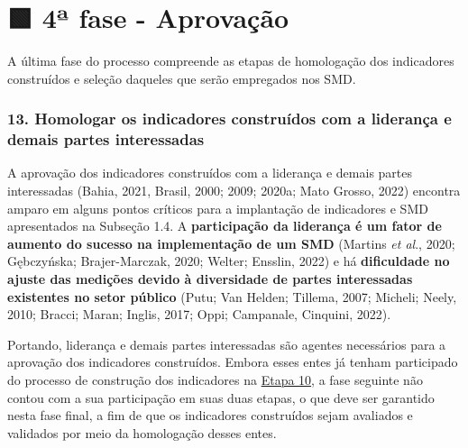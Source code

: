 \documentclass[
  letterpaper,
  DIV=11,
  numbers=noendperiod]{scrreprt}
\begin{document}
\hypertarget{uxaa-fase---aprovauxe7uxe3o}{%
\chapter*{🟩 4ª fase - Aprovação}\label{uxaa-fase---aprovauxe7uxe3o}}


{A última fase do processo compreende as etapas de homologação dos
indicadores construídos e seleção daqueles que serão empregados nos
SMD.}

\hypertarget{homologar-os-indicadores-construuxeddos-com-a-lideranuxe7a-e-demais-partes-interessadas}{%
\subsection*{13. Homologar os indicadores construídos com a liderança e
demais partes
interessadas}\label{homologar-os-indicadores-construuxeddos-com-a-lideranuxe7a-e-demais-partes-interessadas}}

A aprovação dos indicadores construídos com a liderança e demais partes
interessadas (Bahia, 2021, Brasil, 2000; 2009; 2020a; Mato Grosso, 2022)
encontra amparo em alguns pontos críticos para a implantação de
indicadores e SMD apresentados na Subseção 1.4. A \textbf{participação
da liderança é um fator de aumento do sucesso na implementação de um
SMD} (Martins \emph{et al}., 2020; Gębczyńska; Brajer-Marczak, 2020;
Welter; Ensslin, 2022) e há \textbf{dificuldade no ajuste das medições
devido à diversidade de partes interessadas existentes no setor público}
(Putu; Van Helden; Tillema, 2007; Micheli; Neely, 2010; Bracci; Maran;
Inglis, 2017; Oppi; Campanale, Cinquini, 2022).

Portando, liderança e demais partes interessadas são agentes necessários
para a aprovação dos indicadores construídos. Embora esses entes já
tenham participado do processo de construção dos indicadores na
\href{/o/AZWDclIWFqqJuBEvyQWk/s/ws6bIBOPv2tLRHdwbB7y/~/changes/788/3.-construcao-de-indicadores/3.1-o-processo-de-construcao/2a-fase-elaboracao\#10.-aprovar-preliminarmente-os-indicadores-em-construcao-com-as-partes-interessadas}{Etapa
10}, a fase seguinte não contou com a sua participação em suas duas
etapas, o que deve ser garantido nesta fase final, a fim de que os
indicadores construídos sejam avaliados e validados por meio da
homologação desses entes.
\end{document}
